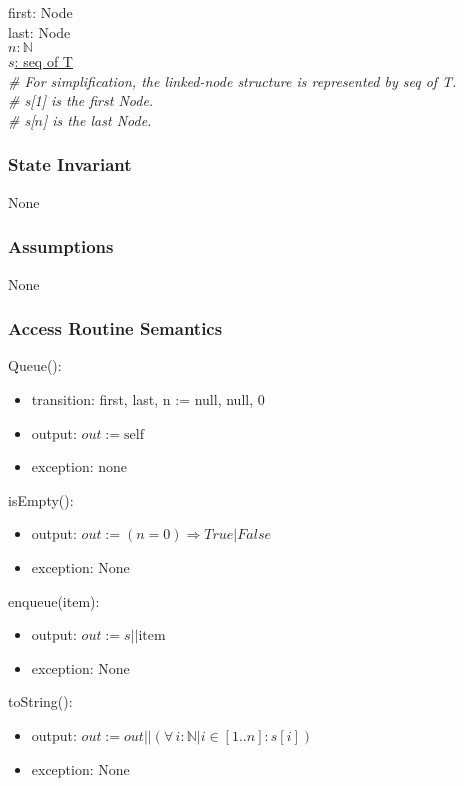 \documentclass[12pt]{article}
\begin{document}
first: Node\\
last: Node\\
$n: \mathbb{N}$\\
\underline{$s$: seq of T}\\

\noindent \textit{\# For simplification, the linked-node structure is represented by seq of T.}\\
\noindent \textit{\# s[1] is the first Node.}\\
\noindent \textit{\# s[$n$] is the last Node.}

\subsubsection* {State Invariant}

None

\subsubsection* {Assumptions}

None

\subsubsection* {Access Routine Semantics}

\noindent Queue():
\begin{itemize}
\item transition: first, last, n := null, null, 0
\item output: $out := \mbox{self}$
\item exception: none
\end{itemize}

\noindent isEmpty():
\begin{itemize}
\item output: $out := (n = 0) \Rightarrow True | False$
\item exception: None
\end{itemize}

\noindent enqueue(item):
\begin{itemize}
\item output: $out := s || \mbox{item}$
\item exception: None
\end{itemize}

\noindent toString():
\begin{itemize}
\item output: $out := out || (\forall\, i: \mathbb{N}| i\in[1..n] : s[i])$
\item exception: None
\end{itemize}
\end{document}
